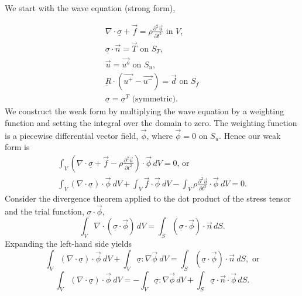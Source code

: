 We start with the wave equation (strong form),

\begin{gather}
\nabla\cdot\underline{\sigma}+\overrightarrow{f}=\rho\frac{\partial^{2}\overrightarrow{u}}{\partial t^{2}}\text{ in }V,\\
\underline{\sigma}\cdot\overrightarrow{n}=\overrightarrow{T}\text{ on }S_{T},\\
\overrightarrow{u}=\overrightarrow{u^{o}}\text{ on }S_{u},\\
\underbar{R}\cdot(\overrightarrow{u^{+}}-\overrightarrow{u^{-}})=\vec{d}\text{ on }S_{f}\\
\underline{\sigma}=\underline{\sigma}^{T}\text{ (symmetric).}
\end{gather}
We construct the weak form by multiplying the wave equation by a weighting
function and setting the integral over the domain to zero. The weighting
function is a piecewise differential vector field, $\overrightarrow{\phi}$,
where $\overrightarrow{\phi}=0$ on $S_{u}.$ Hence our weak form
is
\begin{gather}
\int_{V}\left(\nabla\cdot\underline{\sigma}+\overrightarrow{f}-\rho\frac{\partial^{2}\overrightarrow{u}}{\partial t^{2}}\right)\cdot\overrightarrow{\phi}\, dV=0\text{, or }\\
\int_{V}(\nabla\cdot\underline{\sigma})\cdot\overrightarrow{\phi}\: dV+\int_{V}\overrightarrow{f}\cdot\overrightarrow{\phi}\: dV-\int_{V}\rho\frac{\partial^{2}\overrightarrow{u}}{\partial t^{2}}\cdot\overrightarrow{\phi}\: dV=0.
\end{gather}
 Consider the divergence theorem applied to the dot product of the
stress tensor and the trial function, $\underline{\sigma}\cdot\overrightarrow{\phi}$,
\begin{equation}
\int_{V}\nabla\cdot(\underline{\sigma}\cdot\overrightarrow{\phi})\, dV=\int_{S}(\underline{\sigma}\cdot\overrightarrow{\phi})\cdot\overrightarrow{n}\, dS.
\end{equation}
Expanding the left-hand side yields
\begin{equation}
\int_{V}(\nabla\cdot\underline{\sigma})\cdot\overrightarrow{\phi}\: dV+\int_{V}\underline{\sigma}:\nabla\overrightarrow{\phi}\: dV=\int_{S}(\underline{\sigma}\cdot\overrightarrow{\phi})\cdot\overrightarrow{n}\: dS,\text{ or}
\end{equation}
\begin{equation}
\int_{V}(\nabla\cdot\underline{\sigma})\cdot\overrightarrow{\phi}\: dV=-\int_{V}\underline{\sigma}:\nabla\overrightarrow{\phi}\, dV+\int_{S}\underline{\sigma}\cdot\overrightarrow{n}\cdot\overrightarrow{\phi}\, dS.
\end{equation}
